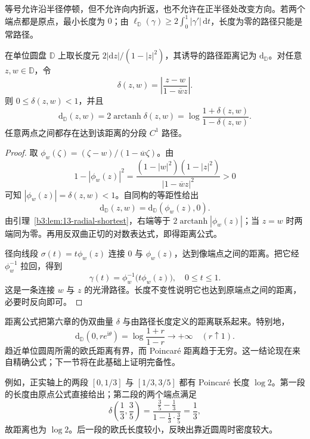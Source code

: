 等号允许沿半径停顿，但不允许向内折返，也不允许在正半径处改变方向。若两个端点都是原点，最小长度为 \(0\)；由 \(\ell_{\mathbb D}(\gamma)\ge2\int_0^1|\gamma'|\,\mathrm dt\)，长度为零的路径只能是常路径。

\begin{theorem}\label{b3:thm:13-disk-distance}
在单位圆盘 \(\mathbb D\) 上取长度元 \(2|\mathrm dz|/(1-|z|^2)\)，其诱导的路径距离记为 \(\mathrm d_{\mathbb D}\)。对任意 \(z,w\in\mathbb D\)，令
\[
 \delta(z,w)=\left|\frac{z-w}{1-\overline w z}\right|.
\]
则 \(0\le\delta(z,w)<1\)，并且
\[
 \mathrm d_{\mathbb D}(z,w)=2\operatorname{arctanh}\delta(z,w)
 =\log\frac{1+\delta(z,w)}{1-\delta(z,w)}.
\]
任意两点之间都存在达到该距离的分段 \(C^1\) 路径。
\end{theorem}
\begin{proof}
取 \(\phi_w(\zeta)=(\zeta-w)/(1-\overline w\zeta)\)。由
\[
 1-|\phi_w(z)|^2
 =\frac{(1-|w|^2)(1-|z|^2)}{|1-\overline w z|^2}>0
\]
可知 \(|\phi_w(z)|=\delta(z,w)<1\)。自同构的等距性给出
\[
 \mathrm d_{\mathbb D}(z,w)
 =\mathrm d_{\mathbb D}(\phi_w(z),0).
\]
由引理~\ref{b3:lem:13-radial-shortest}，右端等于 \(2\operatorname{arctanh}|\phi_w(z)|\)；当 \(z=w\) 时两端同为零。再用反双曲正切的对数表达式，即得距离公式。

径向线段 \(\sigma(t)=t\phi_w(z)\) 连接 \(0\) 与 \(\phi_w(z)\)，达到像端点之间的距离。把它经 \(\phi_w^{-1}\) 拉回，得到
\[
 \gamma(t)=\phi_w^{-1}\bigl(t\phi_w(z)\bigr),
 \quad 0\le t\le1.
\]
这是一条连接 \(w\) 与 \(z\) 的光滑路径。长度不变性说明它也达到原端点之间的距离，必要时反向即可。
\end{proof}

距离公式把第六章的伪双曲量 \(\delta\) 与由路径长度定义的距离联系起来。特别地，
\[
 \mathrm d_{\mathbb D}(0,re^{\mathrm i\theta})
 =\log\frac{1+r}{1-r}\longrightarrow+\infty
 \quad(r\uparrow1).
\]
趋近单位圆周所需的欧氏距离有界，而 Poincaré 距离趋于无穷。这一结论现在来自精确公式；下一节将在此基础上证明完备性。

\ProseParagraphBreak
例如，正实轴上的两段 \([0,1/3]\) 与 \([1/3,3/5]\) 都有 Poincaré 长度 \(\log2\)。第一段的长度由原点公式直接给出；第二段的两个端点满足
\[
 \delta\left(\frac13,\frac35\right)
 =\frac{\frac35-\frac13}{1-\frac13\cdot\frac35}
 =\frac13,
\]
故距离也为 \(\log2\)。后一段的欧氏长度较小，反映出靠近圆周时密度较大。

